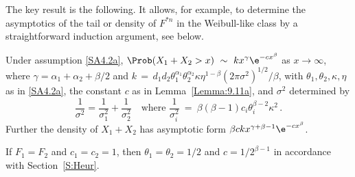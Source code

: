 The key result is the following. It allows, for example,
to determine the asymptotics of the tail
or density of $F^{*n}$ in the Weibull-like class by a straightforward
induction argument, see  below.
\begin{theorem}\label{Th:9.11a} Under assumption \eqref{SA4.2a},
$\displaystyle \Prob(X_1+X_2>x)\ \sim\ k x^{\gamma}\e^{-cx^\beta}$ as $x\to\infty$, where
$ \gamma=\alpha_1+\alpha_2+\beta/2$ and
$k\,=\, d_1 d_2 \theta_1^{\alpha_1} \theta_2^{\alpha_2} \kappa \eta^{1-\beta} (2\pi \sigma^2)^{1/2} / \beta$,
with $\theta_1,\theta_2,\kappa,\eta$ as in \eqref{SA4.2a}, the constant $c$ as in Lemma~\ref{Lemma:9.11a}, and $\sigma^2$ determined
by
\[\frac{1}{\sigma^2}=\frac{1}{\sigma_1^2}+\frac{1}{\sigma_2^2}\quad\text{where }\frac{1}{\sigma_i^2}\ =\ \beta(\beta-1)c_i\theta_i^{\beta-2}\kappa^2 \,. \]
Further the density of $X_1+X_2$ has asymptotic form
$\beta ck x^{\gamma+\beta-1}\e^{-cx^\beta}$.
\end{theorem}
\begin{remark}\label{Rem:9.11a}\rm If $F_1=F_2$ and $c_1=c_2=1$, then $\theta_1=\theta_2=1/2$ and
$c=1/2^{\beta-1}$ in accordance with Section~\ref{S:Heur}.
\remQED\end{remark}
